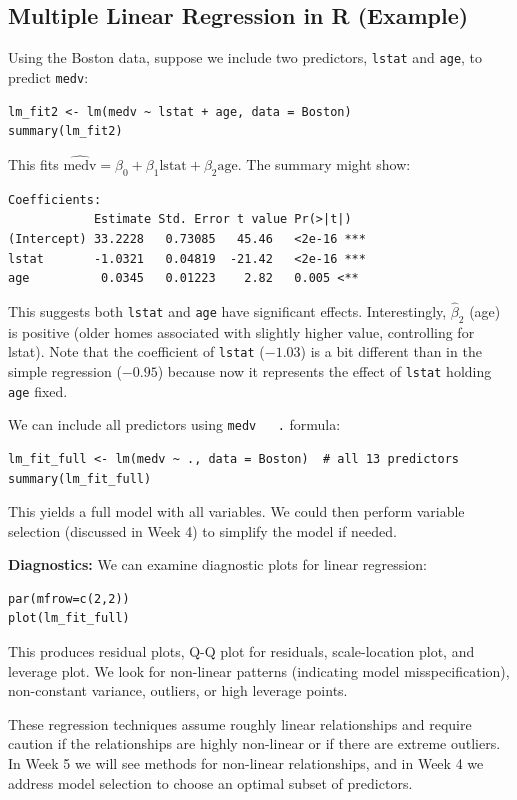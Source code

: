 \documentclass[11pt]{article}
\begin{document}
\subsection{Multiple Linear Regression in R (Example)}
Using the Boston data, suppose we include two predictors, \texttt{lstat} and \texttt{age}, to predict \texttt{medv}:
\begin{verbatim}
lm_fit2 <- lm(medv ~ lstat + age, data = Boston)
summary(lm_fit2)
\end{verbatim}
This fits $\widehat{\text{medv}} = \beta_0 + \beta_1 \text{lstat} + \beta_2 \text{age}$. The summary might show:
\begin{verbatim}
Coefficients:
            Estimate Std. Error t value Pr(>|t|)    
(Intercept) 33.2228   0.73085   45.46   <2e-16 ***
lstat       -1.0321   0.04819  -21.42   <2e-16 ***
age          0.0345   0.01223    2.82   0.005 <**
\end{verbatim}
This suggests both \texttt{lstat} and \texttt{age} have significant effects. Interestingly, $\hat\beta_2$ (age) is positive (older homes associated with slightly higher value, controlling for lstat). Note that the coefficient of \texttt{lstat} ($-1.03$) is a bit different than in the simple regression ($-0.95$) because now it represents the effect of \texttt{lstat} holding \texttt{age} fixed.

We can include all predictors using \texttt{medv ~ .} formula:
\begin{verbatim}
lm_fit_full <- lm(medv ~ ., data = Boston)  # all 13 predictors
summary(lm_fit_full)
\end{verbatim}
This yields a full model with all variables. We could then perform variable selection (discussed in Week 4) to simplify the model if needed.

\textbf{Diagnostics:} We can examine diagnostic plots for linear regression:
\begin{verbatim}
par(mfrow=c(2,2))
plot(lm_fit_full)
\end{verbatim}
This produces residual plots, Q-Q plot for residuals, scale-location plot, and leverage plot. We look for non-linear patterns (indicating model misspecification), non-constant variance, outliers, or high leverage points.

These regression techniques assume roughly linear relationships and require caution if the relationships are highly non-linear or if there are extreme outliers. In Week 5 we will see methods for non-linear relationships, and in Week 4 we address model selection to choose an optimal subset of predictors.
\end{document}
